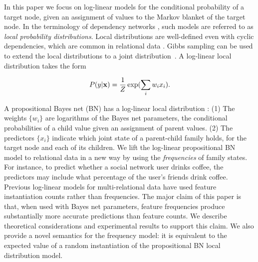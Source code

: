 \documentclass{article}
\begin{document}
In this paper we focus on log-linear models for the  conditional probability of a target node, given an assignment of values to the Markov blanket of the target node. In the terminology of dependency networks \cite{Heckerman2000},  such models are referred to as {\em local probability distributions}. Local distributions are well-defined even with cyclic dependencies, which are common in relational data \cite{bib:jensen-chapter}. Gibbs sampling can be used to extend the local distributions to a joint distribution~\cite{Heckerman2000,Natarajan2012,Lowd2012}. A log-linear local distribution takes the form 

\begin{equation*} \label{eq:regress}
P(y|\mathbf{x}) =  \frac{1}{Z} \exp(\sum_{i} w_{i} x_{i}).
\end{equation*}

A propositional Bayes net (BN) has a log-linear local distribution \cite[Ch.14.5.2]{Russell2010}: (1) The weights $\{w_{i}\}$ are logarithms of the Bayes net parameters, the conditional probabilities of a child value given an assignment of parent values. (2) The predictors $\{x_{i}\}$ indicate which joint state of a parent-child family holds, for the target node and each of its children. We lift the log-linear propositional BN model to relational data in a new way by using the {\em frequencies} of family states. For instance, to predict whether a social network user drinks coffee, 
the predictors may include what percentage of the user's friends drink coffee. 
Previous log-linear models for multi-relational data have used feature instantiation counts rather than frequencies. The major claim of this paper is that, when used with Bayes net parameters, feature frequencies produce substantially more accurate predictions than feature counts. We describe theoretical considerations and experimental results to support this claim. We also provide a novel semantics for the frequency model: it is equivalent to the expected value of a random instantiation of the propositional BN local distribution model. 
\end{document}
